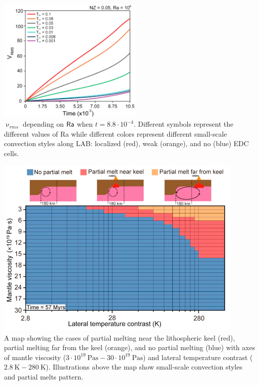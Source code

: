 \begin{center}
\includegraphics[width=7cm]{python_codes/fieldstone_168/images/kiso20e.jpg}\\
{\captionfont 
$\upnu_{rms}$ depending on ${\mathsf{Ra}}$ when $t=8.8\cdot10^{-4}$. Different symbols represent the
different values of Ra while different colors represent different small-scale
convection styles along LAB: localized (red), weak (orange), and no (blue) EDC
cells.}
\end{center}

\begin{center}
\includegraphics[width=12cm]{python_codes/fieldstone_168/images/kiso20f.jpg}\\
{\captionfont A map showing the cases of partial melting
near the lithospheric keel (red), partial melting far
from the keel (orange), and no partial melting (blue)
with axes of mantle viscosity ($3\cdot 10^{19}~\si{\pascal\second}- 30\cdot 10^{19}~\si{\pascal\second}$) 
and lateral temperature contrast ($2.8~\si{\kelvin}-280~\si{\kelvin}$). 
Illustrations above the map show small-scale convection styles and partial melts pattern.}
\end{center}





